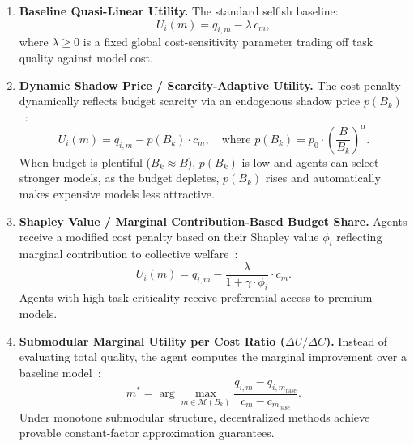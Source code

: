 \documentclass{article}
\begin{document}
\begin{enumerate}[leftmargin=*]
    \item \textbf{Baseline Quasi-Linear Utility.} The standard selfish baseline:
    \begin{equation}
        U_i(m) = q_{i,m} - \lambda \, c_m,
    \end{equation}
    where $\lambda \geq 0$ is a fixed global cost-sensitivity parameter trading off task quality against model cost.

    \item \textbf{Dynamic Shadow Price / Scarcity-Adaptive Utility.} The cost penalty dynamically reflects budget scarcity via an endogenous shadow price $p(B_k)$~\cite{balseiro2019learning, kelly1998rate}:
    \begin{equation}
        U_i(m) = q_{i,m} - p(B_k) \cdot c_m, \quad \text{where } p(B_k) = p_0 \cdot \left(\frac{B}{B_k}\right)^\alpha.
    \end{equation}
    When budget is plentiful ($B_k \approx B$), $p(B_k)$ is low and agents can select stronger models, as the budget depletes, $p(B_k)$ rises and automatically makes expensive models less attractive.

    \item \textbf{Shapley Value / Marginal Contribution-Based Budget Share.} Agents receive a modified cost penalty based on their Shapley value $\phi_i$ reflecting marginal contribution to collective welfare~\cite{chandan2019optimal, marden2013distributed}:
    \begin{equation}
        U_i(m) = q_{i,m} - \frac{\lambda}{1 + \gamma \cdot \phi_i} \cdot c_m.
    \end{equation}
    Agents with high task criticality receive preferential access to premium models.

    \item \textbf{Submodular Marginal Utility per Cost Ratio ($\Delta U / \Delta C$).} Instead of evaluating total quality, the agent computes the marginal improvement over a baseline model~\cite{williams2017decentralised, nemhauser1978analysis}:
    \begin{equation}
        m^* = \arg\max_{m \in \mathcal{M}(B_k)} \frac{q_{i,m} - q_{i,m_{\mathrm{base}}}}{c_m - c_{m_{\mathrm{base}}}}.
    \end{equation}
    Under monotone submodular structure, decentralized methods achieve provable constant-factor approximation guarantees.
\end{enumerate}
\end{document}
